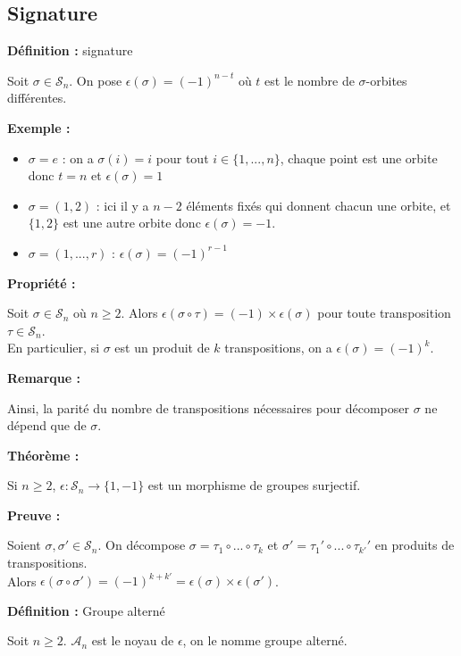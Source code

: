 \documentclass{report}
\newenvironment{definition}[1][]{
    \begin{tcolorbox}[colframe= white]
    \textbf{Définition :} 
    #1 \par
    }
    {\end{tcolorbox}}
\newenvironment{preuve}{\begin{tcolorbox}[colframe= white]
    \textbf{Preuve :}
\par }
    {\end{tcolorbox}}
\newenvironment{prop}{\begin{tcolorbox}[colframe= white]
    \textbf{Propriété :}
     \par}
    {\end{tcolorbox}}
\newenvironment{exemple}{\begin{tcolorbox}[colframe= white]
    \textbf{Exemple :}
     \par}
    {\end{tcolorbox}}
\newenvironment{theoreme}[1][]{
    \begin{tcolorbox}[]
    \textbf{Théorème :} #1  \par} 
    {\end{tcolorbox}}
\newcommand{\remarque}{
    \noindent\textbf{Remarque :} \par
}
\newcommand{\sn}{\mathcal{S}_{n}}
\newcommand{\an}{\mathcal{A}_{n}}
\newcommand{\unn}{\{1, ..., n\}}
\newcommand{\sign}{\epsilon(\sigma)}
\begin{document}
\subsection{Signature}
\begin{definition}[signature]
Soit $\sigma\in\sn$. On pose $\epsilon(\sigma)=(-1)^{n-t}$ où $t$ est le nombre de $\sigma$-orbites différentes.
\end{definition}

\begin{exemple}
\begin{itemize}[label=$\bullet$]
\item $\sigma=e$ : on a $\sigma(i)=i$ pour tout $i\in\unn$, chaque point est une orbite donc $t=n$ et $\sign=1$
\item $\sigma=(1,2)$ : ici il y a $n-2$ éléments fixés qui donnent chacun une orbite, et $\{1,2\}$ est une autre orbite donc $\sign=-1$.
\item $\sigma=(1,...,r)$ : $\sign=(-1)^{r-1}$
\end{itemize}
\end{exemple}

\begin{prop}
Soit $\sigma\in\sn$ où $n\geq2$. Alors $\epsilon(\sigma\circ\tau)=(-1)\times\sign$ pour toute transposition $\tau\in\sn$.\\
En particulier, si $\sigma$ est un produit de $k$ transpositions, on a $\sign=(-1)^k$.
\end{prop}

\remarque{Ainsi, la parité du nombre de transpositions nécessaires pour décomposer $\sigma$ ne dépend que de $\sigma$.}

\begin{theoreme}
Si $n\geq2$, $\epsilon:\sn\longrightarrow\{1,-1\}$ est un morphisme de groupes surjectif.
\end{theoreme}
\begin{preuve}
Soient $\sigma,\sigma'\in\sn$. On décompose $\sigma=\tau_1\circ...\circ\tau_k$ et $\sigma'=\tau_1'\circ...\circ\tau_{k'}'$ en produits de transpositions. \\Alors $\epsilon(\sigma\circ\sigma')=(-1)^{k+k'}=\sign\times\epsilon(\sigma')$.
\end{preuve}

\begin{definition}[Groupe alterné]
Soit $n\geq2$. $\an$ est le noyau de $\epsilon$, on le nomme groupe alterné.
\end{definition}

\par
\par
\end{document}
